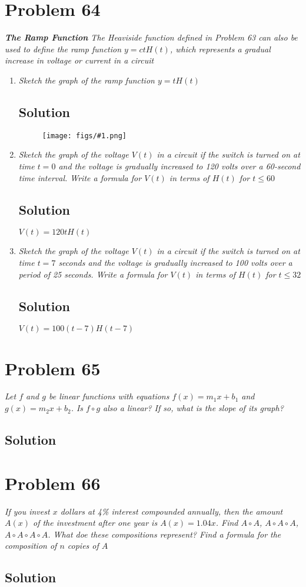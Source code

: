 \documentclass[11pt]{article}
\newcommand{\soln}{\subsection*}
\newcommand{\qn}{\textit}
\newcommand{\imgsoln}[1]{
	\begin{figure}[H]
		\centering
		\texttt{[image: figs/\#1.png]}
	\end{figure}
}
\begin{document}
\section*{Problem 64}

\qn{\textbf{The Ramp Function} The Heaviside function defined in Problem 63 can also be used to define the ramp function $y=ctH(t)$, which represents a gradual increase in voltage or current in a circuit}

\begin{enumerate}
	\item \qn{Sketch the graph of the ramp function $y=tH(t)$}
	\soln{Solution}
	\imgsoln{1.3.64-ans.a}
	
	\item \qn{Sketch the graph of the voltage $V(t)$ in a circuit if the switch is turned on at time $t=0$ and the voltage is gradually increased to 120 volts over a 60-second time interval. Write a formula for $V(t)$ in terms of $H(t)$ for $t \le 60$}
	\soln{Solution}
	$V(t)=120tH(t)$
	
	\item \qn{Sketch the graph of the voltage $V(t)$ in a circuit if the switch is turned on at time $t=7$ seconds and the voltage is gradually increased to 100 volts over a period of 25 seconds. Write a formula for $V(t)$ in terms of $H(t)$ for $t \le 32$}
	\soln{Solution}
	$V(t)=100(t-7)H(t-7)$
\end{enumerate}

\section*{Problem 65}

\qn{Let $f$ and $g$ be linear functions with equations $f(x)=m_1x+b_1$ and $g(x)=m_2x+b_2$. Is $f \circ g$ also a linear? If so, what is the slope of its graph?}

\soln{Solution}

\section*{Problem 66}

\qn{If you invest $x$ dollars at 4\% interest compounded annually, then the amount $A(x)$ of the investment after one year is $A(x)=1.04x$. Find $A \circ A$, $A \circ A \circ A$, $A \circ A \circ A \circ A$. What doe these compositions represent? Find a formula for the composition of $n$ copies of $A$}

\soln{Solution}
\end{document}
